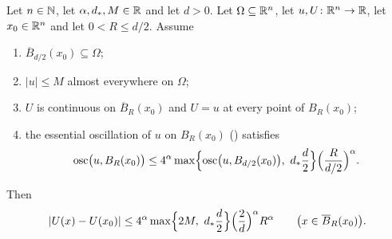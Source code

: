 \begin{helper}
Let $n\in\mathbb{N}$, let $\alpha,d_\ast,M\in\mathbb{R}$ and let $d>0$.  Let
$\Omega\subseteq\mathbb{R}^n$, let $u,U\colon\mathbb{R}^n\to\mathbb{R}$, let $x_0\in\mathbb{R}^n$ and let
$0<R\le d/2$.  Assume
\begin{enumerate}
\item $\overline B_{d/2}(x_0)\subseteq\Omega$;
\item $|u|\le M$ almost everywhere on $\Omega$;
\item $U$ is continuous on $\overline B_R(x_0)$ and $U=u$ at every point of
  $B_R(x_0)$;
\item the essential oscillation of $u$ on $B_R(x_0)$ ()
  satisfies
  \[
  \operatorname*{osc}\bigl(u,B_R(x_0)\bigr)
  \le4^{\alpha}\max\Bigl\{\operatorname*{osc}\bigl(u,B_{d/2}(x_0)\bigr),\
  d_\ast\frac d2\Bigr\}\Bigl(\frac{R}{d/2}\Bigr)^{\alpha}.
  \]
\end{enumerate}
Then
\[
|U(x)-U(x_0)|\le4^{\alpha}\max\Bigl\{2M,\ d_\ast\frac d2\Bigr\}
  \Bigl(\frac2d\Bigr)^{\alpha}R^{\alpha}
\qquad\bigl(x\in\overline B_R(x_0)\bigr).
\]
\end{helper}

